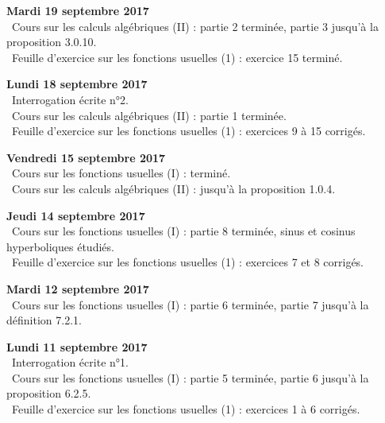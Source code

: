 \documentclass[12pt,a4paper]{article}
\begin{document}
\noindent\textbf{Mardi 19 septembre 2017}\\
\bu\ Cours sur les calculs algébriques (II) : partie 2 terminée, partie 3 jusqu'à la proposition 3.0.10. \\
\bu\ Feuille d'exercice sur les fonctions usuelles (1) : exercice 15 terminé. \\
\vspace{.4cm}

\noindent\textbf{Lundi 18 septembre 2017}\\
\bu\ Interrogation écrite n°2.\\
\bu\ Cours sur les calculs algébriques (II) : partie 1 terminée. \\
\bu\ Feuille d'exercice sur les fonctions usuelles (1) : exercices 9 à 15 corrigés. \\
\vspace{.4cm}

\noindent\textbf{Vendredi 15 septembre 2017}\\
\bu\ Cours sur les fonctions usuelles (I) : terminé. \\
\bu\ Cours sur les calculs algébriques (II) : jusqu'à la proposition 1.0.4. \\
\vspace{.4cm}

\noindent\textbf{Jeudi 14 septembre 2017}\\
\bu\ Cours sur les fonctions usuelles (I) : partie 8 terminée, sinus et cosinus hyperboliques étudiés. \\
\bu\ Feuille d'exercice sur les fonctions usuelles (1) : exercices 7 et 8 corrigés. \\
\vspace{.4cm}

\noindent\textbf{Mardi 12 septembre 2017}\\
\bu\ Cours sur les fonctions usuelles (I) : partie 6 terminée, partie 7 jusqu'à la définition 7.2.1. \\
\vspace{.4cm}

\noindent\textbf{Lundi 11 septembre 2017}\\
\bu\ Interrogation écrite n°1. \\
\bu\ Cours sur les fonctions usuelles (I) : partie 5 terminée, partie 6 jusqu'à la proposition 6.2.5. \\
\bu\ Feuille d'exercice sur les fonctions usuelles (1) : exercices 1 à 6 corrigés. \\
\vspace{.4cm}
\end{document}
